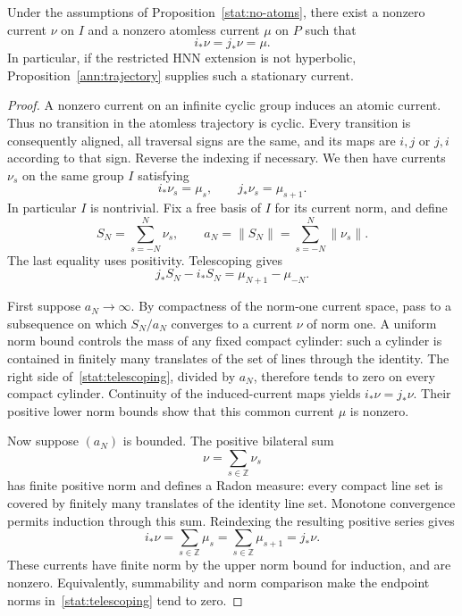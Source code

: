 \begin{proposition}\label{stat:stationary}
Under the assumptions of Proposition~\ref{stat:no-atoms}, there exist
a nonzero current $\nu$ on $I$ and a nonzero atomless current $\mu$ on
$P$ such that
\begin{equation}\label{stat:stationary-equality}
                         i_*\nu=j_*\nu=\mu.
\end{equation}
In particular, if the restricted HNN extension is not hyperbolic,
Proposition~\ref{ann:trajectory} supplies such a stationary current.
\end{proposition}
\begin{proof}
A nonzero current on an infinite cyclic group induces an atomic
current.  Thus no transition in the atomless trajectory is cyclic.
Every transition is consequently aligned, all traversal signs are
the same, and its maps are $i,j$ or $j,i$ according to that sign.
Reverse the indexing if necessary.  We then have currents $\nu_s$ on
the same group $I$ satisfying
\[
                    i_*\nu_s=\mu_s,
             \qquad j_*\nu_s=\mu_{s+1}.
\]
In particular $I$ is nontrivial.  Fix a free basis of $I$ for its
current norm, and define
\[
 S_N=\sum_{s=-N}^N\nu_s,\qquad
 a_N=\|S_N\|=\sum_{s=-N}^N\|\nu_s\|.
\]
The last equality uses positivity.  Telescoping gives
\begin{equation}\label{stat:telescoping}
             j_*S_N-i_*S_N=\mu_{N+1}-\mu_{-N}.
\end{equation}

First suppose $a_N\to\infty$.  By compactness of the norm-one
current space, pass to a subsequence on which $S_N/a_N$ converges to a
current $\nu$ of norm one.  A uniform norm bound controls the mass of
any fixed compact cylinder: such a cylinder is contained in finitely
many translates of the set of lines through the identity.  The right
side of~\eqref{stat:telescoping}, divided by $a_N$, therefore tends
to zero on every compact cylinder.  Continuity of the induced-current
maps yields $i_*\nu=j_*\nu$.  Their positive lower norm bounds show
that this common current $\mu$ is nonzero.

Now suppose $(a_N)$ is bounded.  The positive bilateral sum
\[
                         \nu=\sum_{s\in\mathbb Z}\nu_s
\]
has finite positive norm and defines a Radon measure: every compact
line set is covered by finitely many translates of the identity line
set.  Monotone convergence permits induction through this sum.
Reindexing the resulting positive series gives
\[
 i_*\nu=\sum_{s\in\mathbb Z}\mu_s
        =\sum_{s\in\mathbb Z}\mu_{s+1}=j_*\nu.
\]
These currents have finite norm by the upper norm bound for
induction, and are nonzero.  Equivalently, summability and norm
comparison make the endpoint norms in~\eqref{stat:telescoping}
tend to zero.


\end{proof}
